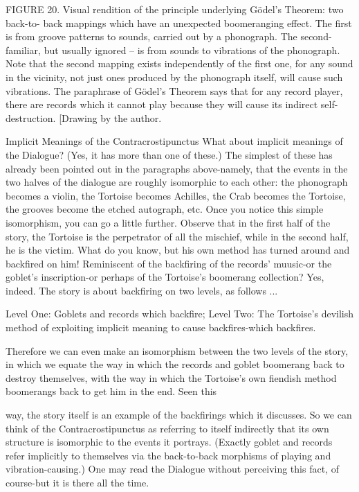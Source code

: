 FIGURE 20. Visual rendition of the principle underlying Gödel’s Theorem: two back-to- back mappings which have an unexpected boomeranging effect. The first is from groove patterns to sounds, carried out by a phonograph. The second-familiar, but usually ignored -- is from sounds to vibrations of the phonograph. Note that the second mapping exists independently of the first one, for any sound in the vicinity, not just ones produced by the phonograph itself, will cause such vibrations. The paraphrase of Gödel’s Theorem says that for any record player, there are records which it cannot play because they will cause its indirect self-destruction. [Drawing by the author. 





Implicit Meanings of the Contracrostipunctus What about implicit meanings of the Dialogue? (Yes, it has more than one of these.) The simplest of these has already been pointed out in the paragraphs above-namely, that the events in the two halves of the dialogue are roughly isomorphic to each other: the phonograph becomes a violin, the Tortoise becomes Achilles, the Crab becomes the Tortoise, the grooves become the etched autograph, etc. Once you notice this simple isomorphism, you can go a little further. Observe that in the first half of the story, the Tortoise is the perpetrator of all the mischief, while in the second half, he is the victim. What do you know, but his own method has turned around and backfired on him! Reminiscent of the backfiring of the records' muusic-or the goblet's inscription-or perhaps of the Tortoise's boomerang collection? Yes, indeed. The story is about backfiring on two levels, as follows ... 

Level One: Goblets and records which backfire; Level Two: The Tortoise's devilish method of exploiting implicit meaning to cause backfires-which backfires. 

Therefore we can even make an isomorphism between the two levels of the story, in which we equate the way in which the records and goblet boomerang back to destroy themselves, with the way in which the Tortoise's own fiendish method boomerangs back to get him in the end. Seen this 







way, the story itself is an example of the backfirings which it discusses. So we can think of the Contracrostipunctus as referring to itself indirectly that its own structure is isomorphic to the events it portrays. (Exactly goblet and records refer implicitly to themselves via the back-to-back morphisms of playing and vibration-causing.) One may read the Dialogue without perceiving this fact, of course-but it is there all the time. 

